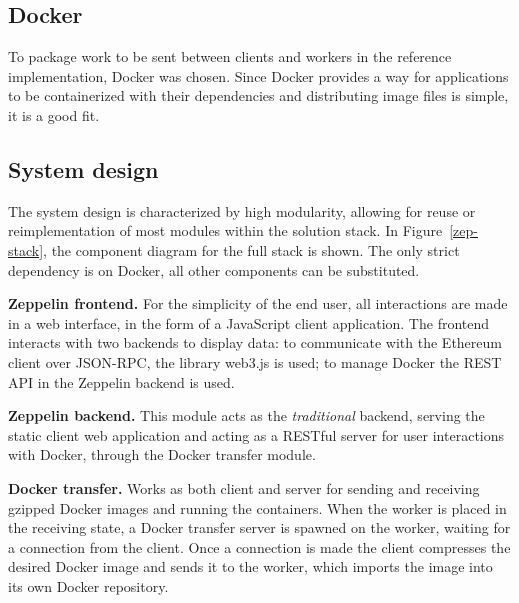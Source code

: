 \subsection{Docker}
To package work to be sent between clients and workers in the reference implementation, Docker was chosen. Since Docker provides a way for applications to be containerized with their dependencies and distributing image files is simple, it is a good fit.

\subsection{System design}
The system design is characterized by high modularity, allowing for reuse or reimplementation of most modules within the solution stack. In Figure~\ref{zep-stack}, the component diagram for the full stack is shown. The only strict dependency is on Docker, all other components can be substituted.

\textbf{Zeppelin frontend.} For the simplicity of the end user, all interactions are made in a web interface, in the form of a JavaScript client application. The frontend interacts with two backends to display data: to communicate with the Ethereum client over JSON-RPC, the library web3.js is used; to manage Docker the REST API in the Zeppelin backend is used.

\textbf{Zeppelin backend.} This module acts as the \textit{traditional} backend, serving the static client web application and acting as a RESTful server for user interactions with Docker, through the Docker transfer module.

\textbf{Docker transfer.} Works as both client and server for sending and receiving gzipped Docker images and running the containers. When the worker is placed in the receiving state, a Docker transfer server is spawned on the worker, waiting for a connection from the client. Once a connection is made the client compresses the desired Docker image and sends it to the worker, which imports the image into its own Docker repository.

